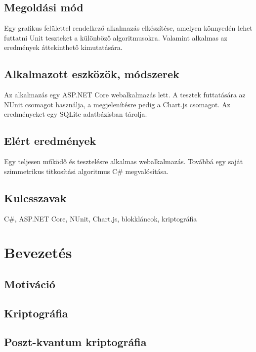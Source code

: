 \documentclass[12pt]{report} %
\begin{document}
\section*{Megoldási mód} %

Egy grafikus felülettel rendelkező alkalmazás elkészítése, amelyen könnyedén lehet futtatni Unit teszteket a különböző algoritmusokra. Valamint alkalmas az eredmények áttekinthető kimutatására.

\section*{Alkalmazott eszközök, módszerek} %

Az alkalmazás egy ASP.NET Core webalkalmazás lett. A tesztek futtatására az NUnit csomagot használja, a megjelenítésre pedig a Chart.js csomagot. Az eredményeket egy SQLite adatbázisban tárolja.

\section*{Elért eredmények} %

Egy teljesen működő és tesztelésre alkalmas webalkalmazás. Továbbá egy saját szimmetrikus titkosítási algoritmus C\# megvalósítása.

\section*{Kulcsszavak} %

C\#, ASP.NET Core, NUnit, Chart.js, blokkláncok, kriptográfia

\chapter{Bevezetés} %

\section{Motiváció} %

\section{Kriptográfia} %

\section{Poszt-kvantum kriptográfia} %
\end{document}
